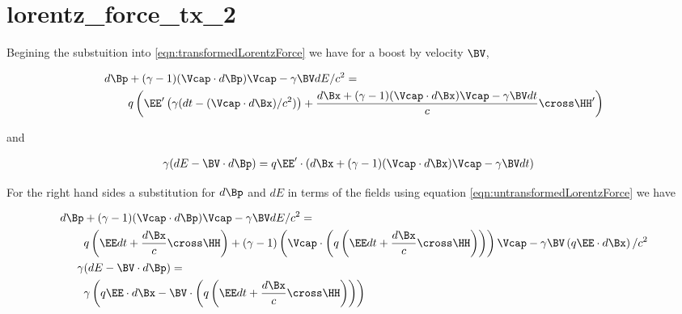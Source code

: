%
%
%
%
%
%
%
%
\chapter{lorentz_force_tx_2}

Begining the substuition into \ref{eqn:transformedLorentzForce} we have for a boost by velocity $\BV$, 

\begin{align*}
d\Bp &+ (\gamma-1)(\Vcap \cdot d\Bp) \Vcap - \gamma \BV dE/c^2 = \\
&q \left( \EE' \left(\gamma ( dt - (\Vcap \cdot d\Bx )/c^2 )\right) + \frac{d\Bx + (\gamma-1)(\Vcap \cdot d\Bx) \Vcap - \gamma \BV dt}{c} \cross \HH' \right)  \\
\end{align*}

and

\begin{align*}
\gamma ( dE - \BV \cdot d\Bp ) &= q \EE' \cdot \left(d\Bx + (\gamma-1)(\Vcap \cdot d\Bx) \Vcap - \gamma \BV dt\right)
\end{align*}

For the right hand sides a substitution for $d\Bp$ and $dE$ in terms of the fields using equation
\ref{eqn:untransformedLorentzForce} we have


\begin{align*}
d\Bp &+ (\gamma-1)(\Vcap \cdot d\Bp) \Vcap - \gamma \BV dE/c^2 = \\
&q \left( \EE dt + \frac{d\Bx}{c} \cross \HH \right) + (\gamma-1)\left(\Vcap \cdot \left(q \left( \EE dt + \frac{d\Bx}{c} \cross \HH \right)\right)\right) \Vcap - \gamma \BV \left( q \EE \cdot d\Bx \right)/c^2  \\
\gamma &( dE - \BV \cdot d\Bp ) = \\
&\gamma \left( q \EE \cdot d\Bx - \BV \cdot \left(q \left( \EE dt + \frac{d\Bx}{c} \cross \HH \right)\right) \right) 
\end{align*}

